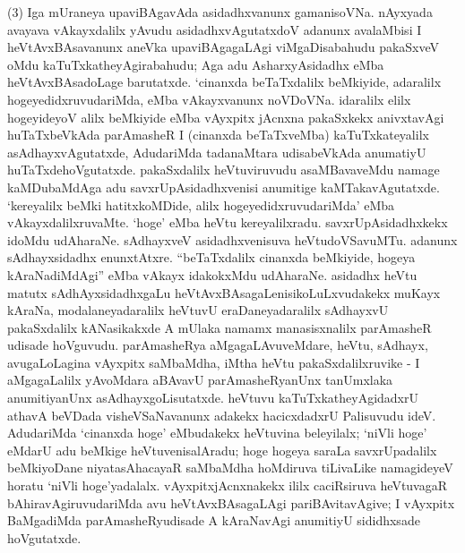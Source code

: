 (3) Iga mUraneya upaviBAgavAda asidadhxvanunx gamanisoVNa. nAyxyada avayava vAkayxdalilx yAvudu asidadhxvAgutatxdoV adanunx avalaMbisi I heVtAvxBAsa\-vanunx aneVka upaviBAgagaLAgi viMgaDisabahudu  pakaSxveV oMdu kaTuTxkathe\-yAgira\-bahudu; Aga adu AsharxyAsidadhx eMba heVtAvxBAsadoLage barutatxde. `cinanxda beTaTx\-dalilx beMkiyide, adaralilx hogeyedidxruvudariMda, eMba vAkayxvanunx noVDoVNa. idaralilx elilx hogeyideyoV alilx beMkiyide eMba vAyxpitx jAcnxna pakaSxkekx anivxtavAgi huTaTxbeVkAda parAmasheR I (cinanxda beTaTxveMba) kaTuTxkateyalilx asAdhayxvAgutatxde, AdudariMda tadanaMtara udisabeVkAda anumatiyU huTaTxdehoVgutatxde.  pakaSx\-dalilx heVtuviruvudu asaMBavaveMdu namage kaMDubaMdAga adu savxrUpA\-sidadhxvenisi anu\-mitige kaMTakavAgutatxde. `kereyalilx beMki hatitxkoMDide, alilx hogeyedidxruvudariMda' eMba vAkayxdalilxruvaMte. `hoge' eMba heVtu kereyalilxradu. savxrUpA\-sidadhxkekx idoMdu udAharaNe.  sAdhayxveV asidadhxvenisuva heVtudoVSavuMTu. adanunx sAdhayx\-sidadhx enunxtAtxre. ``beTaTxdalilx cinanxda beMkiyide, hogeya kAraNadiMdAgi'' eMba vAkayx ida\-kokxMdu udAharaNe. asidadhx heVtu matutx sAdhAyxsidadhxgaLu heVtAvx\-BAsagaLenisikoLuLx\-vudakekx muKayx kAraNa, modalaneyadaralilx heVtuvU eraDaneyadaralilx sAdhayxvU pakaSx\-dalilx kANasikakxde A mUlaka namamx manasisxnalilx parAmasheR udisade hoVguvudu. parAmasheRya aMgagaLAvuveMdare, heVtu, sAdhayx, avugaLoLagina vAyxpitx saMbaMdha, iMtha heVtu pakaSxdalilxruvike - I aMgagaLalilx yAvoMdara aBAvavU parAmasheR\-yanUnx tanUmxlaka anumitiyanUnx asAdhayxgoLisutatxde. heVtuvu kaTuTxkatheyAgi\-dadxrU athavA beVDada visheVSaNavanunx adakekx hacicxdadxrU Palisuvudu ideV. AdudariMda `cinanxda hoge' eMbudakekx heVtuvina beleyilalx; `niVli hoge' eMdarU adu \hbox{beMkige} heVtuvenisalAradu; hoge hogeya saraLa savxrUpadalilx beMkiyoDane niyata\-sAha\-cayaR saMbaMdha hoMdiruva tiLivaLike namagideyeV horatu `niVli hoge'yadalalx. vAyxpitxjAcnxnakekx ililx caciRsiruva heVtuvagaR bAhiravAgiruvudariMda avu heVtAvxBAsa\-gaLAgi pariBAvitavAgive; I vAyxpitx BaMgadiMda parAmasheRyudisade A kAraNavAgi anumitiyU sididhxsade hoVgutatxde.

